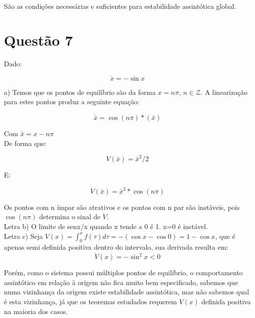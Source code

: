 São as condições necessárias e suficientes para estabilidade assintótica global. 

\section{Questão 7}
Dado:

\begin{equation}
\dot{x} = -\sin x
\end{equation}

a) Temos que os pontos de equilíbrio são da forma $x=n\pi$, $n\in \mathcal{Z}$. A linearização para estes pontos produz a seguinte equação:

\begin{equation}
\dot{\bar{x}} = \cos (n\pi)*(\bar{x})
\end{equation}

Com $\bar{x} = x-n\pi$\\

De forma que:

\begin{equation}
V(\bar{x}) = \bar{x}^2/2
\end{equation}

E:

\begin{equation}
\dot{V}(\bar{x}) = \bar{x}^2*\cos(n\pi)
\end{equation}

Os pontos com n ímpar são atrativos e os pontos com n par são instáveis, pois $\cos(n\pi)$ determina o sinal de $\dot{V}$.\\

Letra b) O limite de senx/x quando x tende a 0 é 1. x=0 é instável.\\

Letra c) Seja $V(x) = \int_{0}^{x} f(\tau) d\tau = -(\cos x-\cos 0) = 1 - \cos x$, que é apenas semi definida positiva dentro do intervalo, sua derivada resulta em:\\

\begin{equation}
\dot{V}(x) = - \sin^2 x < 0
\end{equation}

Porém, como o sistema possui múltiplos pontos de equilíbrio, o comportamento assintótico em relação à origem não fica muito bem especificado, sabemos que numa vizinhança da origem existe estabilidade assintótica, mas não sabemos qual é esta vizinhança, já que os teoremas estudados requerem $V(x)$ definida positiva na maioria dos casos.\\ 

